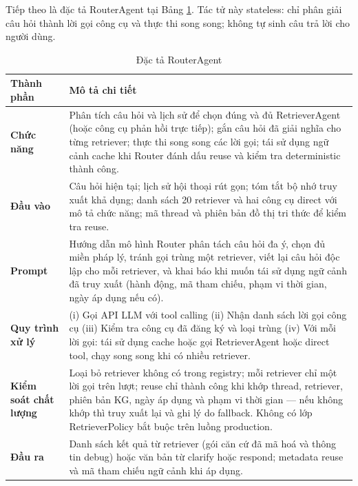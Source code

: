 \documentclass[../DoAn.tex]{subfiles}
\begin{document}
Tiếp theo là đặc tả RouterAgent tại Bảng \ref{table: router_agent}. Tác tử này stateless: chỉ phân giải câu hỏi thành lời gọi công cụ và thực thi song song; không tự sinh câu trả lời cho người dùng.

\begin{table}[H]
\centering
\begin{tabularx}{\textwidth}{|>{\raggedright\arraybackslash}p{3.8cm}|>{\raggedright\arraybackslash}X|}
\hline
\textbf{Thành phần} & \textbf{Mô tả chi tiết} \\ \hline
\textbf{Chức năng} & Phân tích câu hỏi và lịch sử để chọn đúng và đủ RetrieverAgent (hoặc công cụ phản hồi trực tiếp); gắn câu hỏi đã giải nghĩa cho từng retriever; thực thi song song các lời gọi; tái sử dụng ngữ cảnh cache khi Router đánh dấu reuse và kiểm tra deterministic thành công. \\ \hline
\textbf{Đầu vào} & Câu hỏi hiện tại; lịch sử hội thoại rút gọn; tóm tắt bộ nhớ truy xuất khả dụng; danh sách 20 retriever và hai công cụ direct với mô tả chức năng; mã thread và phiên bản đồ thị tri thức để kiểm tra reuse. \\ \hline
\textbf{Prompt} & Hướng dẫn mô hình Router phân tách câu hỏi đa ý, chọn đủ miền pháp lý, tránh gọi trùng một retriever, viết lại câu hỏi độc lập cho mỗi retriever, và khai báo khi muốn tái sử dụng ngữ cảnh đã truy xuất (hành động, mã tham chiếu, phạm vi thời gian, ngày áp dụng nếu có). \\ \hline
\textbf{Quy trình xử lý} & (i) Gọi API LLM với tool calling (ii) Nhận danh sách lời gọi công cụ (iii) Kiểm tra công cụ đã đăng ký và loại trùng (iv) Với mỗi lời gọi: tái sử dụng cache hoặc gọi RetrieverAgent hoặc direct tool, chạy song song khi có nhiều retriever. \\ \hline
\textbf{Kiểm soát chất lượng} & Loại bỏ retriever không có trong registry; mỗi retriever chỉ một lời gọi trên lượt; reuse chỉ thành công khi khớp thread, retriever, phiên bản KG, ngày áp dụng và phạm vi thời gian --- nếu không khớp thì truy xuất lại và ghi lý do fallback. Không có lớp RetrieverPolicy bắt buộc trên luồng production. \\ \hline
\textbf{Đầu ra} & Danh sách kết quả từ retriever (gói căn cứ đã mã hoá và thông tin debug) hoặc văn bản từ clarify hoặc respond; metadata reuse và mã tham chiếu ngữ cảnh khi áp dụng. \\ \hline
\end{tabularx}
\caption{Đặc tả RouterAgent}
\label{table: router_agent}
\end{table}
\end{document}
